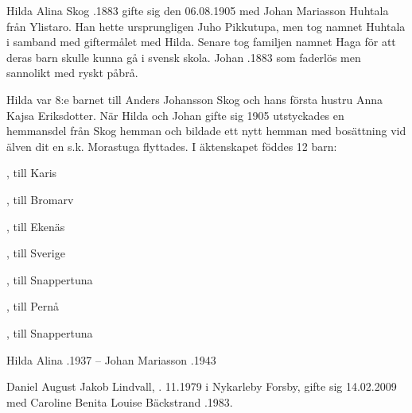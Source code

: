 Hilda  Alina Skog .1883 gifte sig den 06.08.1905 med Johan Mariasson Huhtala från Ylistaro. Han hette ursprungligen Juho Pikkutupa, men tog namnet Huhtala i samband med giftermålet med Hilda. Senare tog familjen namnet Haga för att deras barn skulle kunna gå i svensk skola. Johan .1883 som faderlös men sannolikt med ryskt påbrå.

Hilda var 8:e barnet till Anders Johansson Skog och hans första hustru Anna Kajsa Eriksdotter. När Hilda och Johan gifte sig 1905 utstyckades en hemmansdel från Skog hemman och bildade ett nytt hemman med bosättning vid älven dit en s.k. Morastuga flyttades. I äktenskapet föddes 12 barn:
\begin{jhchildren}
  \item {}
  \item {}
  \item {}
  \item {}, till Karis
  \item {}
  \item {}, till Bromarv
  \item {}, till Ekenäs
  \item {}, till Sverige
  \item {}, till Snappertuna
  \item {}
  \item {}, till Pernå
  \item {}, till Snappertuna
\end{jhchildren}

Hilda Alina .1937  --   Johan Mariasson .1943




Daniel August Jakob Lindvall, . 11.1979 i Nykarleby Forsby, gifte sig 14.02.2009 med Caroline Benita Louise Bäckstrand .1983.

